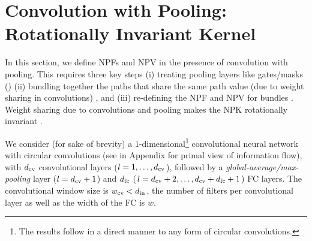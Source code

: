 \section{Convolution with Pooling: Rotationally Invariant Kernel}\label{sec:conv}

In this section, we define NPFs and NPV in the presence of convolution with pooling. This requires three key steps (i) treating pooling layers like gates/masks () (ii) bundling together the paths that share the same path value (due to weight sharing in convolutions) , and (iii) re-defining the NPF and NPV for bundles . Weight sharing due to convolutions and pooling makes the NPK rotationally invariant .

We consider (for sake of brevity) a $1$-dimensional\footnote{The results follow in a direct manner to any form of circular convolutions.} convolutional neural network with circular convolutions (see  in Appendix for primal view of information flow), with $d_{\text{cv}}$ convolutional layers ($l=1,\ldots,d_{\text{cv}}$), followed by a \emph{global-average/max-pooling} layer ($l=d_{\text{cv}}+1$) and $d_{\text{fc}}$ ($l=d_{\text{cv}}+2,\ldots,d_{\text{cv}}+d_{\text{fc}}+1$) FC  layers. The convolutional window size is $w_{\text{cv}}<d_{\text{in}}$, the number of filters per convolutional layer as well as the width of the FC is $w$. 

